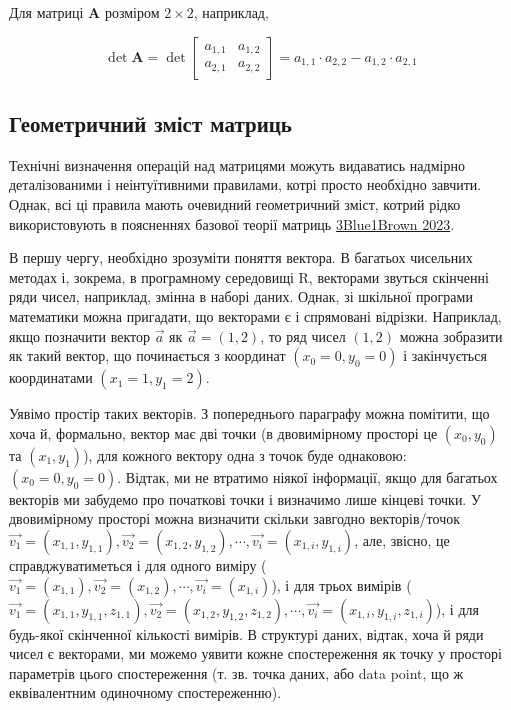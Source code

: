 \documentclass[
  11pt,
]{book}
\begin{document}
Для матриці \(\mathbf{A}\) розміром \(2 \times 2\), наприклад,

\[\det \mathbf{A} = \det \begin{bmatrix}
a_{1, 1} & a_{1, 2} \\
a_{2, 1} & a_{2, 2}
\end{bmatrix} = a_{1, 1} \cdot a_{2, 2} - a_{1, 2} \cdot a_{2, 1}\]

\subsection{Геометричний зміст матриць}\label{matrices_art}

Технічні визначення операцій над матрицями можуть видаватись надмірно деталізованими і неінтуїтивними правилами, котрі просто необхідно завчити. Однак, всі ці правила мають очевидний геометричний зміст, котрий рідко використовують в поясненнях базової теорії матриць \href{https://youtube.com/playlist?list=PLZHQObOWTQDPD3MizzM2xVFitgF8hE_ab}{3Blue1Brown 2023}.

В першу чергу, необхідно зрозуміти поняття вектора. В багатьох чисельних методах і, зокрема, в програмному середовищі R, векторами звуться скінченні ряди чисел, наприклад, змінна в наборі даних. Однак, зі шкільної програми математики можна пригадати, що векторами є і спрямовані відрізки. Наприклад, якщо позначити вектор \(\vec{a}\) як \(\vec{a} = (1, 2)\), то ряд чисел \((1, 2)\) можна зобразити як такий вектор, що починається з координат \((x_0 = 0, y_0 = 0)\) і закінчується координатами \((x_1 = 1, y_1 = 2)\).

Уявімо простір таких векторів. З попереднього параграфу можна помітити, що хоча й, формально, вектор має дві точки (в двовимірному просторі це \((x_0, y_0)\) та \((x_1, y_1)\)), для кожного вектору одна з точок буде однаковою: \((x_0 = 0, y_0 = 0)\). Відтак, ми не втратимо ніякої інформації, якщо для багатьох векторів ми забудемо про початкові точки і визначимо лише кінцеві точки. У двовимірному просторі можна визначити скільки завгодно векторів/точок \(\vec{v_1} = (x_{1, 1}, y_{1, 1}), \vec{v_2} = (x_{1, 2}, y_{1, 2}), \cdots, \vec{v_i} = (x_{1, i}, y_{1, i})\), але, звісно, це справджуватиметься і для одного виміру (\(\vec{v_1} = (x_{1, 1}), \vec{v_2} = (x_{1, 2}), \cdots, \vec{v_i} = (x_{1, i})\)), і для трьох вимірів (\(\vec{v_1} = (x_{1, 1}, y_{1, 1}, z_{1, 1}), \vec{v_2} = (x_{1, 2}, y_{1, 2}, z_{1, 2}), \cdots, \vec{v_i} = (x_{1, i}, y_{1, i}, z_{1, i})\)), і для будь-якої скінченної кількості вимірів. В структурі даних, відтак, хоча й ряди чисел є векторами, ми можемо уявити кожне спостереження як точку у просторі параметрів цього спостереження (т. зв. точка даних, або data point, що ж еквівалентним одиночному спостереженню).
\end{document}
